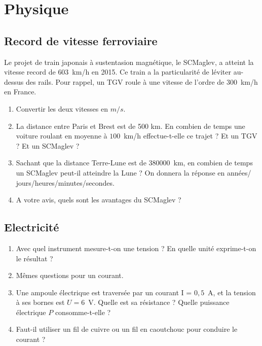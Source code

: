 \section{Physique}

\subsection{Record de vitesse ferroviaire}
Le projet de train japonais à sustentasion magnétique, le SCMaglev, a atteint la vitesse record de $603$~km/h en 2015. Ce train a la particularité de léviter au-dessus des rails. Pour rappel, un TGV roule à une vitesse de l'ordre de $300$~km/h en France.\\
\begin{enumerate}
    \item Convertir les deux vitesses en $m/s$.
    \item La distance entre Paris et Brest est de 500 km. En combien de temps une voiture roulant en moyenne à $100$~km/h effectue-t-elle ce trajet ? Et un TGV ? Et un SCMaglev ?
    \item Sachant que la distance Terre-Lune est de $380 000$~km, en combien de temps un SCMaglev peut-il atteindre la Lune ? On donnera la réponse en années/ jours/heures/minutes/secondes.
    \item A votre avis, quels sont les avantages du SCMaglev ?
\end{enumerate}

\subsection{Electricité}
\begin{enumerate}
    \item Avec quel instrument mesure-t-on une tension ? En quelle unité exprime-t-on le résultat ?
    \item Mêmes questions pour un courant.
    \item Une ampoule électrique est traversée par un courant I = $0,5$~A, et la tension à ses bornes est $U= 6$~V. Quelle est sa résistance ? Quelle puissance électrique $P$ consomme-t-elle ? 
    \item Faut-il utiliser un fil de cuivre ou un fil en caoutchouc pour conduire le courant ?
\end{enumerate}

